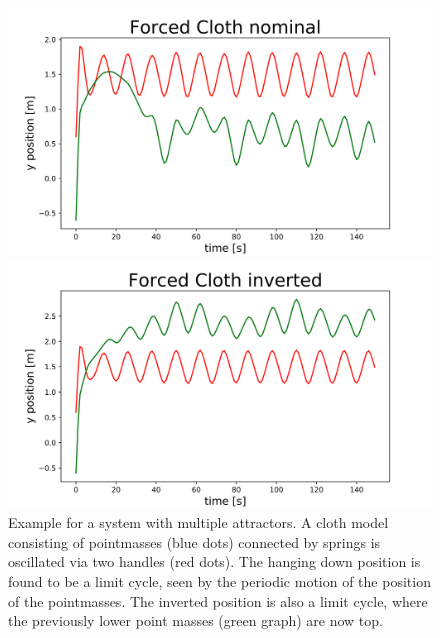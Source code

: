 \begin{figure}[h!]
        
        \begin{minipage}{0.4\textwidth}
            \centering
            \includegraphics[width=\textwidth]{figures/forced_cloth_nominal_graph.png} %
        \end{minipage}
        \begin{minipage}{0.4\textwidth}
            \centering
            \includegraphics[width=\textwidth]{figures/forced_cloth_inverted_graph.png} %
        \end{minipage}

    \caption[Example for systems with multiple attractors: Inverted Cloth]{Example for a system with multiple attractors. A cloth model consisting of pointmasses (blue dots) connected by springs is oscillated via two handles (red dots). The hanging down position is found to be a limit cycle, seen by the periodic motion of the position of the pointmasses. The inverted position is also a limit cycle, where the previously lower point masses (green graph) are now top.}
    \label{fig:invcloth}
\end{figure}

